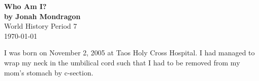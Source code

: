 \documentclass[12pt]{article}
\begin{document}
\doublespacing

\begin{titlepage}
    \begin{center}
        \vspace*{1.5in}
        {\huge\bfseries{Who Am I?}}\\
            {\bfseries{by Jonah Mondragon}}\\
            World History Period 7\\
            \today
    \end{center}
\end{titlepage}

I was born on November 2, 2005 at Taos Holy Cross Hospital.
I had managed to wrap my neck in the umbilical cord such that I had to be removed from my mom's stomach by c-section.
\end{document}
